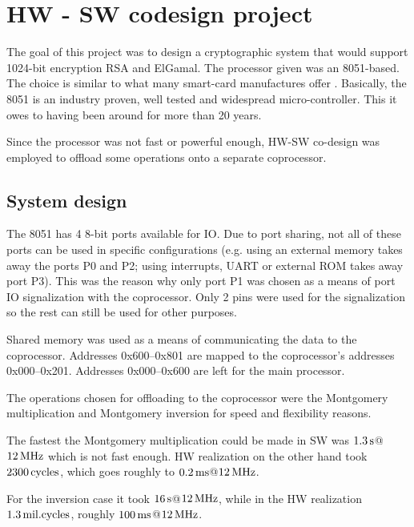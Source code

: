 \chapter{HW - SW codesign project}
\label{cha:codesign_project}
\author{Boran Car \and Victor Statescu}

The goal of this project was to design a cryptographic system that
would support 1024-bit encryption RSA and ElGamal. The processor given
was an 8051-based. The choice is similar to what many smart-card
manufactures offer \cite{smartcard_crypto_coprocs,
  smartcard_crypto_coprocs2}. Basically, the 8051 is an industry
proven, well tested and widespread micro-controller. This it owes to
having been around for more than 20 years.

Since the processor was not fast or powerful enough, HW-SW co-design
was employed to offload some operations onto a separate coprocessor.

\section{System design}

The 8051 has 4 8-bit ports available for IO. Due to port sharing, not
all of these ports can be used in specific configurations (e.g. using
an external memory takes away the ports P0 and P2; using interrupts,
UART or external ROM takes away port P3). This was the reason why only
port P1 was chosen as a means of port IO signalization with the
coprocessor. Only 2 pins were used for the signalization so the rest
can still be used for other purposes.  

Shared memory was used as a means of communicating the data to the
coprocessor.  Addresses 0x600--0x801 are mapped to the coprocessor's
addresses 0x000--0x201. Addresses 0x000--0x600 are left for the main
processor.

The operations chosen for offloading to the coprocessor were the
Montgomery multiplication and Montgomery inversion for speed and
flexibility reasons.

The fastest the Montgomery multiplication could be made in SW was
$\unit[1.3]{s}$@$\unit[12]{MHz}$ which is not fast enough. HW
realization on the other hand took $\unit[2300]{cycles}$, which goes
roughly to $\unit[0.2]{ms}$@$\unit[12]{MHz}$.

For the inversion case it took $\unit[16]{s}$@$\unit[12]{MHz}$, while
in the HW realization $\unit[1.3]{mil. cycles}$, roughly
$\unit[100]{ms}$@$\unit[12]{MHz}$.

